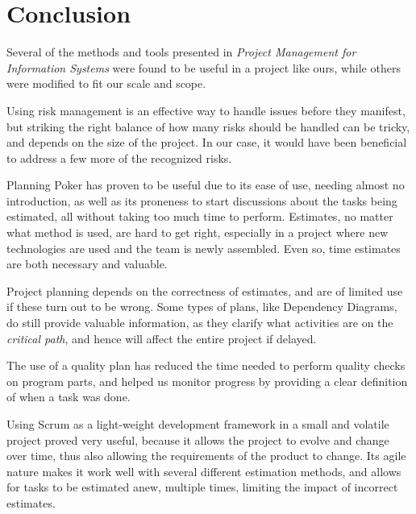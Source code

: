 \section{Conclusion}

Several of the methods and tools presented in \emph{Project Management for
Information Systems}\cite{caye} were found to be useful in a project like ours,
while others were modified to fit our scale and scope.

Using risk management is an effective way to handle issues before they
manifest, but striking the right balance of how many risks should be handled
can be tricky, and depends on the size of the project. In our case, it would
have been beneficial to address a few more of the recognized risks.

Planning Poker has proven to be useful due to its ease of use, needing
almost no introduction, as well as its proneness to start discussions about the
tasks being estimated, all without taking too much time to perform.
Estimates, no matter what method is used, are hard to get right, especially
in a project where new technologies are used and the team is newly assembled.
Even so, time estimates are both necessary and valuable.

Project planning depends on the correctness of estimates, and are of limited use
if these turn out to be wrong. Some types of plans, like Dependency Diagrams, do
still provide valuable information, as they clarify what activities are on the
\emph{critical path}, and hence will affect the entire project if delayed.

The use of a quality plan has reduced the time needed to perform quality checks
on program parts, and helped us monitor progress by providing a clear
definition of when a task was done.

Using Scrum as a light-weight development framework in a small and volatile
project proved very useful, because it allows the project to evolve and change
over time, thus also allowing the requirements of the product to change. Its
agile nature makes it work well with several different estimation methods, and
allows for tasks to be estimated anew, multiple times, limiting the impact of
incorrect estimates.
